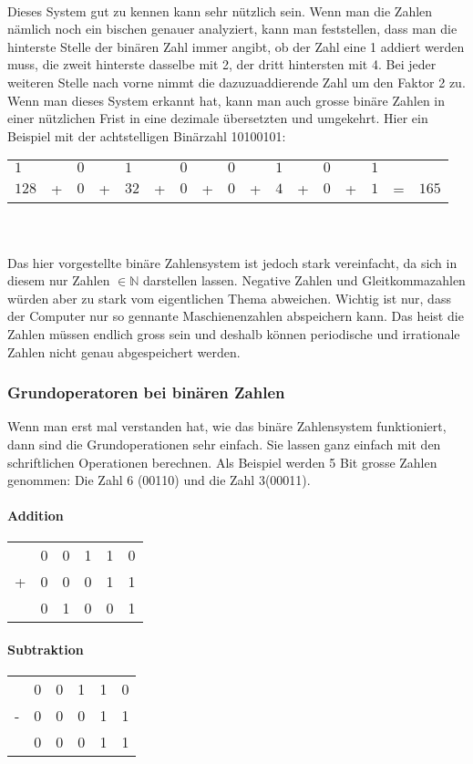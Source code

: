 \\
Dieses System gut zu kennen kann sehr nützlich sein. Wenn man die Zahlen nämlich noch ein bischen genauer analyziert, kann man feststellen, dass man die hinterste Stelle der binären Zahl immer angibt, ob der Zahl eine 1 addiert werden muss, die zweit hinterste dasselbe mit 2, der dritt hintersten mit 4. Bei jeder weiteren Stelle nach vorne nimmt die dazuzuaddierende Zahl um den Faktor 2 zu. Wenn man dieses System erkannt hat, kann man auch grosse binäre Zahlen in einer nützlichen Frist in eine dezimale übersetzten und umgekehrt. Hier ein Beispiel mit der achtstelligen Binärzahl 10100101:
\\
\begin{tabular}{l l l l l l l l l l l l l l l l l}
$1$ & & $0$ & &  $1$ & & $0$ & & $0$ & & $1$ & & $0$ & & $1$ & & \\
$ 128 $ &+& $0$ &+& $ 32$ &+& $0$ &+& $0$ &+& $ 4$ &+& $0$ &+& $1$ &=& $165$ \\ 
\end{tabular} \\
\\
Das hier vorgestellte binäre Zahlensystem ist jedoch stark vereinfacht, da sich in diesem nur Zahlen $\in \mathbb{N} $ darstellen lassen. Negative Zahlen und Gleitkommazahlen würden aber zu stark vom eigentlichen Thema abweichen. Wichtig ist nur, dass der Computer nur so gennante Maschienenzahlen abspeichern kann. Das heist die Zahlen müssen endlich gross sein und deshalb können periodische und irrationale Zahlen nicht genau abgespeichert werden.
\subsubsection{Grundoperatoren bei binären Zahlen}
Wenn man erst mal verstanden hat, wie das binäre Zahlensystem funktioniert, dann sind die Grundoperationen sehr einfach. Sie lassen ganz einfach mit den schriftlichen Operationen berechnen. Als Beispiel werden 5 Bit grosse Zahlen genommen: Die Zahl 6 (00110) und die Zahl 3(00011).
\paragraph{Addition}
\begin{tabular}{llllll}
&0&0&1&1&0 \\
+&0&0&0&1&1 \\ \hline
&0&1&0&0&1
\end{tabular}
\paragraph{Subtraktion}
\begin{tabular}{llllll}
&0&0&1&1&0 \\
-&0&0&0&1&1 \\ \hline
&0&0&0&1&1
\end{tabular}
